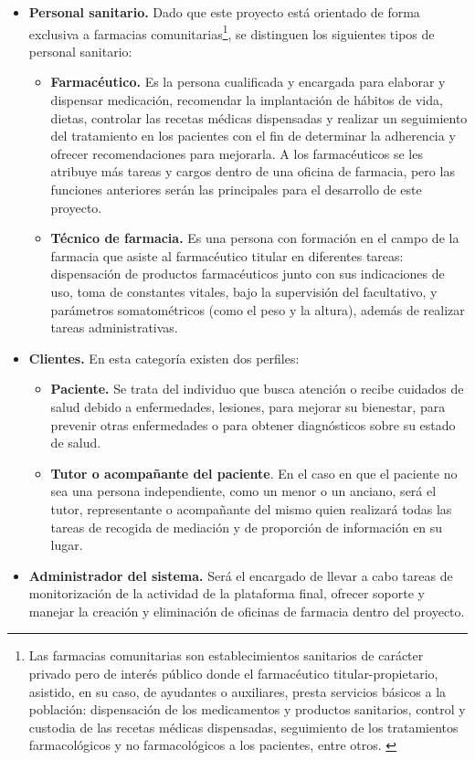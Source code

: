 \begin{itemize}
	\item \textbf{Personal sanitario.} Dado que este proyecto está orientado de forma exclusiva a farmacias comunitarias\footnote{Las farmacias comunitarias son establecimientos sanitarios de carácter privado pero de interés público donde el farmacéutico titular-propietario, asistido, en su caso, de ayudantes o auxiliares, presta servicios básicos a la población: dispensación de los medicamentos y productos sanitarios, control y custodia de las recetas médicas dispensadas, seguimiento de los tratamientos farmacológicos y no farmacológicos a los pacientes, entre otros. \cite{Ley16_1997}}, se distinguen los siguientes tipos de personal sanitario:
	\begin{itemize}
		\item \textbf{Farmacéutico.} Es la persona cualificada y encargada para elaborar y dispensar medicación, recomendar la implantación de hábitos de vida, dietas, controlar las recetas médicas dispensadas y realizar un seguimiento del tratamiento en los pacientes con el fin de determinar la adherencia y ofrecer recomendaciones para mejorarla. A los farmacéuticos se les atribuye más tareas y cargos dentro de una oficina de farmacia, pero las  funciones anteriores serán las principales para el desarrollo de este proyecto.
		
		\item \textbf{Técnico de farmacia.} Es una persona con formación en el campo de la farmacia que asiste al farmacéutico titular en diferentes tareas: dispensación de productos farmacéuticos junto con sus indicaciones de uso, toma de constantes vitales, bajo la supervisión del facultativo, y parámetros somatométricos (como el peso y la altura), además de realizar tareas administrativas.
	\end{itemize}

	\item \textbf{Clientes.} En esta categoría existen dos perfiles:
	\begin{itemize}
		\item \textbf{Paciente.} Se trata del individuo que busca atención o recibe cuidados de salud debido a enfermedades, lesiones, para mejorar su bienestar, para prevenir otras enfermedades o para obtener diagnósticos sobre su estado de salud. \cite{UniNavarra}
		
		\item \textbf{Tutor o acompañante del paciente}. En el caso en que el paciente no sea una persona independiente, como un menor o un anciano, será el tutor, representante o acompañante del mismo quien realizará todas las tareas de recogida de mediación y de proporción de información en su lugar.
	\end{itemize}

	\item \textbf{Administrador del sistema.} Será el encargado de llevar a cabo tareas de monitorización de la actividad de la plataforma final, ofrecer soporte y manejar la creación y eliminación de oficinas de farmacia dentro del proyecto. 
\end{itemize}

